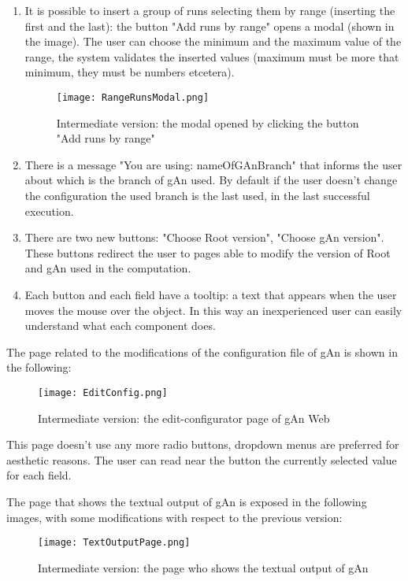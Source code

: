 \begin{enumerate}
\item It is possible to insert a group of runs selecting them by range (inserting the first and the last): the button "Add runs by range" opens a modal (shown in the image). The user can choose the minimum and the maximum value of the range, the system validates the inserted values (maximum must be more that minimum, they must be numbers etcetera).

\begin{figure}[H]
\centering
\texttt{[image: RangeRunsModal.png]}  
\caption{Intermediate version: the modal opened by clicking the button "Add runs by range"}
\end{figure}

\item There is a message "You are using: nameOfGAnBranch" that informs the user about which is the branch of gAn used. By default if the user doesn't change the configuration the used branch is the last used, in the last successful execution.

\item There are two new buttons: "Choose Root version", "Choose gAn version". These buttons redirect the user to pages able to modify the version of Root and gAn used in the computation.
 
\item Each button and each field have a tooltip: a text that appears when the user moves the mouse over the object. In this way an inexperienced user can easily understand what each component does.  

\end{enumerate}


The page related to the modifications of the configuration file of gAn is shown in the following:

\begin{figure}[H]
\centering
\texttt{[image: EditConfig.png]} 
\caption{Intermediate version: the edit-configurator page of gAn Web}
\end{figure}

This page doesn't use any more radio buttons, dropdown menus are preferred for aesthetic reasons. The user can read near the button the currently selected value for each field. 

\newpage

The page that shows the textual output of gAn is exposed in the following images, with some modifications with respect to the previous version:

\begin{figure}[H]
\centering
\texttt{[image: TextOutputPage.png]} 
\caption{Intermediate version: the page who shows the textual output of gAn}
\end{figure}


